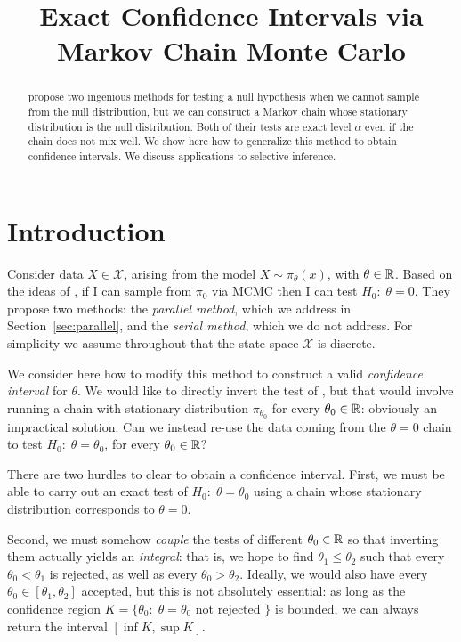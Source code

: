 \documentclass{article}
\theoremstyle{definition}
\newcommand{\cX}{\mathcal{X}}
\begin{document}
\title{Exact Confidence Intervals via Markov Chain Monte Carlo}
\maketitle


\begin{abstract}
  \citet{besag1989generalized} propose two ingenious methods for testing a null hypothesis when we cannot sample from the null distribution, but we can construct a Markov chain whose stationary distribution is the null distribution. Both of their tests are exact level $\alpha$ even if the chain does not mix well. We show here how to generalize this method to obtain confidence intervals. We discuss applications to selective inference. 
\end{abstract}


\section{Introduction}

Consider data $X\in \cX$, arising from the model $X \sim \pi_\theta(x)$, with $\theta\in\mathbb{R}$. Based on the ideas of \citet{besag1989generalized}, if I can sample from $\pi_0$ via MCMC then I can test $H_0:\;\theta=0$. They propose two methods: the {\em parallel method}, which we address in Section~\ref{sec:parallel}, and the {\em serial method}, which we do not address. For simplicity we assume throughout that the state space $\cX$ is discrete.

We consider here how to modify this method to construct a valid {\em confidence interval} for $\theta$. We would like to directly invert the test of \citet{besag1989generalized}, but that would involve running a chain with stationary distribution $\pi_{\theta_0}$ for every $\theta_0\in \mathbb{R}$: obviously an impractical solution. Can we instead re-use the data coming from the $\theta=0$ chain to test $H_0:\;\theta=\theta_0$, for every $\theta_0\in\mathbb{R}$?

There are two hurdles to clear to obtain a confidence interval. First, we must be able to carry out an exact test of $H_0:\; \theta=\theta_0$ using a chain whose stationary distribution corresponds to $\theta=0$.

Second, we must somehow {\em couple} the tests of different $\theta_0\in \mathbb{R}$ so that inverting them actually yields an {\em integral}: that is, we hope to find $\theta_1\leq \theta_2$ such that every $\theta_0<\theta_1$ is rejected, as well as every $\theta_0>\theta_2$. Ideally, we would also have every $\theta_0\in [\theta_1,\theta_2]$ accepted, but this is not absolutely essential: as long as the confidence region $K=\{\theta_0:\; \theta=\theta_0 \text{ not rejected }\}$ is bounded, we can always return the interval $[\inf K, \sup K]$.
\end{document}
